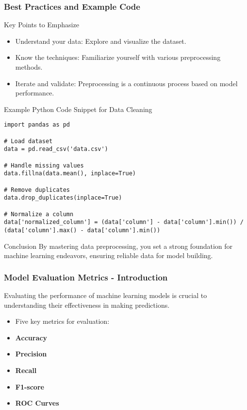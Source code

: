\documentclass[aspectratio=169]{beamer}
\begin{document}
\begin{frame}[fragile]
    \frametitle{Best Practices and Example Code}
    \begin{block}{Key Points to Emphasize}
        \begin{itemize}
            \item Understand your data: Explore and visualize the dataset.
            \item Know the techniques: Familiarize yourself with various preprocessing methods.
            \item Iterate and validate: Preprocessing is a continuous process based on model performance.
        \end{itemize}
    \end{block}

    \begin{alertblock}{Example Python Code Snippet for Data Cleaning}
        \begin{lstlisting}
import pandas as pd

# Load dataset
data = pd.read_csv('data.csv')

# Handle missing values
data.fillna(data.mean(), inplace=True)

# Remove duplicates
data.drop_duplicates(inplace=True)

# Normalize a column
data['normalized_column'] = (data['column'] - data['column'].min()) / (data['column'].max() - data['column'].min())
        \end{lstlisting}
    \end{alertblock}

    \begin{block}{Conclusion}
        By mastering data preprocessing, you set a strong foundation for machine learning endeavors, ensuring reliable data for model building.
    \end{block}
\end{frame}

\begin{frame}[fragile]
    \frametitle{Model Evaluation Metrics - Introduction}
    Evaluating the performance of machine learning models is crucial to understanding their effectiveness in making predictions. 
    \begin{itemize}
        \item Five key metrics for evaluation:
        \item \textbf{Accuracy}
        \item \textbf{Precision}
        \item \textbf{Recall}
        \item \textbf{F1-score}
        \item \textbf{ROC Curves}
    \end{itemize}
\end{frame}
\end{document}
